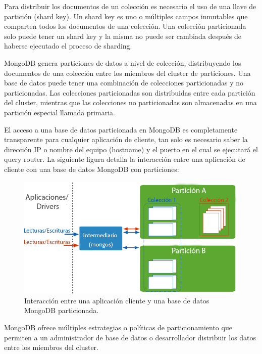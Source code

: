 Para distribuir los documentos de un colección es necesario el uso de una llave de partición (shard key). Un shard key es uno o
múltiples campos inmutables que comparten todos los documentos de una colección. Una colección particionada solo puede tener un shard key
y la misma no puede ser cambiada después de haberse ejecutado el proceso de sharding.

MongoDB genera particiones de datos a nivel de colección, distribuyendo los documentos de una colección entre los miembros
del cluster de particiones. Una base de datos puede tener una combinación de colecciones particionadas y no particionadas.
Las colecciones particionadas son distribuidas entre cada partición del cluster, mientras que las colecciones no particionadas son
almacenadas en una partición especial llamada primaria.

El acceso a una base de datos particionada en MongoDB es completamente transparente para cualquier aplicación de cliente, tan
solo es necesario saber la dirección IP o nombre del equipo (hostname) y el puerto en el cual se ejecutará el query router.
La siguiente figura detalla la interacción entre una aplicación de cliente con una base de datos MongoDB con particiones:

\begin{figure}[H]
	\centering
		\includegraphics[width=.7\textwidth]{figures/sharding_apps}
	\caption{Interacción entre una aplicación cliente y una base de datos MongoDB particionada.}
	\label{fig:sharding_apps}
\end{figure}

MongoDB ofrece múltiples estrategias o políticas de particionamiento que permiten a un administrador de base de datos
o desarrollador distribuir los datos entre los miembros del cluster.

